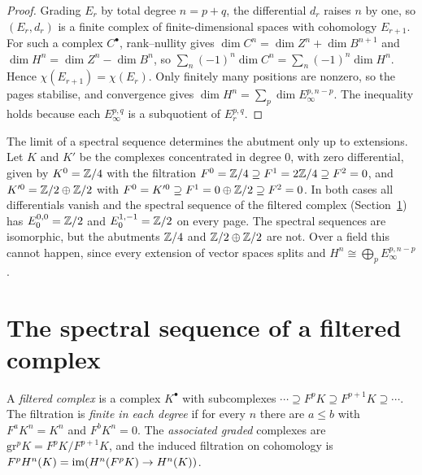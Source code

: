 \begin{proof}
Grading $E_r$ by total degree $n = p + q$, the differential $d_r$ raises $n$ by one, so $(E_r, d_r)$ is a finite complex of finite-dimensional spaces with cohomology $E_{r+1}$. For such a complex
$C^\bullet$, rank--nullity gives $\dim C^n = \dim Z^n + \dim B^{n+1}$ and $\dim H^n = \dim Z^n - \dim B^n$, so $\sum_n(-1)^n\dim C^n = \sum_n(-1)^n\dim H^n$. Hence $\chi(E_{r+1}) = \chi(E_r)$. Only finitely many
positions are nonzero, so the pages stabilise, and convergence gives $\dim H^n = \sum_p\dim E_\infty^{p,n-p}$. The inequality holds because each $E_\infty^{p,q}$ is a subquotient of $E_r^{p,q}$.
\end{proof}

\begin{counterexample}\label{spectral-sequences:counterexample-extension}
The limit of a spectral sequence determines the abutment only up to extensions. Let $K$ and $K'$ be the complexes concentrated in degree $0$, with zero differential, given by $K^0 = \mathbb{Z}/4$ with the filtration
$F^0 = \mathbb{Z}/4 \supseteq F^1 = 2\mathbb{Z}/4 \supseteq F^2 = 0$, and $K'^0 = \mathbb{Z}/2 \oplus \mathbb{Z}/2$ with $F^0 = K'^0 \supseteq F^1 = 0 \oplus \mathbb{Z}/2 \supseteq F^2 = 0$. In both cases all differentials vanish and the spectral
sequence of the filtered complex (Section~\ref{spectral-sequences:section-filtered-complex}) has $E_0^{0,0} = \mathbb{Z}/2$ and $E_0^{1,-1} = \mathbb{Z}/2$ on every page. The spectral sequences are isomorphic, but the abutments
$\mathbb{Z}/4$ and $\mathbb{Z}/2 \oplus \mathbb{Z}/2$ are not. Over a field this cannot happen, since every extension of vector spaces splits and $H^n \cong \bigoplus_pE_\infty^{p,n-p}$.
\end{counterexample}

\section{The spectral sequence of a filtered complex}\label{spectral-sequences:section-filtered-complex}

\begin{definition}\label{spectral-sequences:definition-filtered-complex}
A \emph{filtered complex} is a complex $K^\bullet$ with subcomplexes $\cdots \supseteq F^pK \supseteq F^{p+1}K \supseteq \cdots$. The
filtration is \emph{finite in each degree} if for every $n$ there are $a \leq b$ with $F^aK^n = K^n$ and $F^bK^n = 0$. The
\emph{associated graded} complexes are $\mathrm{gr}^pK = F^pK/F^{p+1}K$, and the induced filtration on cohomology is
$F^pH^n(K) = \operatorname{im}(H^n(F^pK) \to H^n(K))$.
\end{definition}

